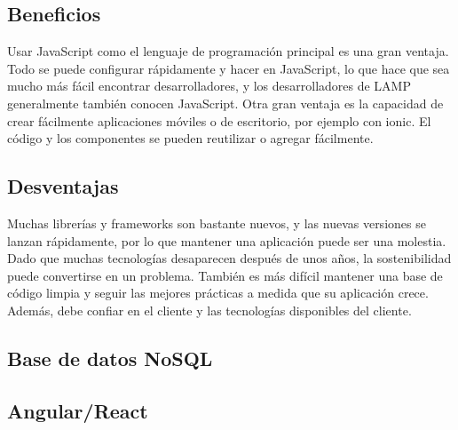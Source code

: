 \subsection{Beneficios}
Usar JavaScript como el lenguaje de programación principal es una gran ventaja. Todo se puede configurar rápidamente y hacer en JavaScript, lo que hace que sea mucho más fácil encontrar desarrolladores, y los desarrolladores de LAMP generalmente también conocen JavaScript. Otra gran ventaja es la capacidad de crear fácilmente aplicaciones móviles o de escritorio, por ejemplo con \Gls{ionic}. El código y los componentes se pueden reutilizar o agregar fácilmente.

\subsection{Desventajas}
Muchas librerías y \glspl{framework} son bastante nuevos, y las nuevas versiones se lanzan rápidamente, por lo que mantener una aplicación puede ser una molestia. Dado que muchas tecnologías desaparecen después de unos años, la sostenibilidad puede convertirse en un problema. También es más difícil mantener una base de código limpia y seguir las mejores prácticas a medida que su aplicación crece. Además, debe confiar en el cliente y las tecnologías disponibles del cliente.

\newpage
\subsection{Base de datos NoSQL}


\subsection{Angular/React}
